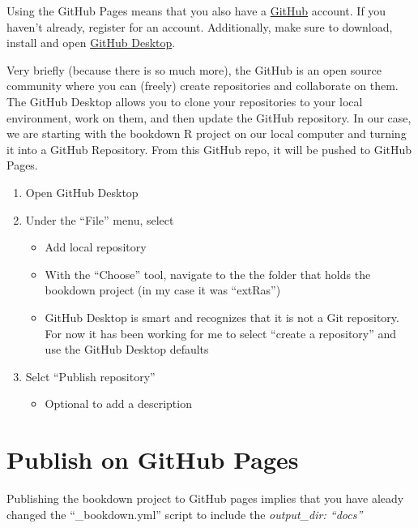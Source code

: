 \documentclass[
]{book}
\providecommand{\tightlist}{%
  \setlength{\itemsep}{0pt}\setlength{\parskip}{0pt}}
\begin{document}
Using the GitHub Pages means that you also have a \href{https://github.com}{GitHub} account. If you haven't already, register for an account. Additionally, make sure to download, install and open \href{https://desktop.github.com/}{GitHub Desktop}.

Very briefly (because there is so much more), the GitHub is an open source community where you can (freely) create repositories and collaborate on them. The GitHub Desktop allows you to clone your repositories to your local environment, work on them, and then update the GitHub repository. In our case, we are starting with the bookdown R project on our local computer and turning it into a GitHub Repository. From this GitHub repo, it will be pushed to GitHub Pages.

\begin{enumerate}
\def\labelenumi{\arabic{enumi}.}
\tightlist
\item
  Open GitHub Desktop
\item
  Under the ``File'' menu, select

  \begin{itemize}
  \tightlist
  \item
    Add local repository
  \item
    With the ``Choose'' tool, navigate to the the folder that holds the bookdown project (in my case it was ``extRas'')
  \item
    GitHub Desktop is smart and recognizes that it is not a Git repository. For now it has been working for me to select ``create a repository'' and use the GitHub Desktop defaults
  \end{itemize}
\item
  Selct ``Publish repository''

  \begin{itemize}
  \tightlist
  \item
    Optional to add a description
  \end{itemize}
\end{enumerate}

\hypertarget{publish-on-github-pages}{%
\section{Publish on GitHub Pages}\label{publish-on-github-pages}}

Publishing the bookdown project to GitHub pages implies that you have aleady changed the ``\_bookdown.yml'' script to include the \emph{output\_dir: ``docs''}
\end{document}
